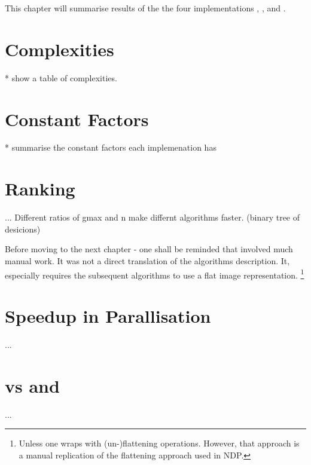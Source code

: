 

This chapter will summarise results of the the four implementations
\seq, \man, \ndpn and \npdv.

\section{Complexities}
  * show a table of complexities.

\section{Constant Factors}
  * summarise the constant factors each implemenation has

\section{Ranking}
  ...
  Different ratios of gmax and n make differnt algorithms faster. (binary tree of desicions)
  
  
  Before moving to the next chapter - one shall be reminded that
  \man involved much manual work. It was not a direct translation
  of the algorithms description. It, especially requires
  the subsequent algorithms to use a flat image representation.
  \footnote{Unless one wraps \man with (un-)flattening operations.
  However, that approach is a manual replication of the
  flattening approach used in NDP.}
  
\section{Speedup in Parallisation}
  ...

\section{\man vs \ndpn and \ndpv}
  ...

